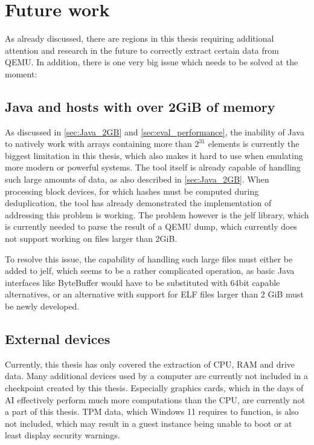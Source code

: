 \section{Future work}
As already discussed, there are regions in this thesis requiring additional attention and research in the future to correctly extract certain data from QEMU.
In addition, there is one very big issue which needs to be solved at the moment:

\subsection{Java and hosts with over 2GiB of memory}
As discussed in \autoref{sec:Java_2GB} and \autoref{sec:eval_performance},
the inability of Java to natively work with arrays containing more than $2^{31}$ elements
is currently the biggest limitation in this thesis,
which also makes it hard to use when emulating more modern or powerful systems.
The tool itself is already capable of handling such large amounts of data, as also described in \autoref{sec:Java_2GB}.
When processing block devices, for which hashes must be computed during deduplication,
the tool has already demonstrated the implementation of addressing this problem is working.
The problem however is the jelf library, which is currently needed to parse the result of a QEMU dump,
which currently does not support working on files larger than 2GiB.

To resolve this issue, the capability of handling such large files must either be added to jelf,
which seems to be a rather complicated operation,
as basic Java interfaces like ByteBuffer would have to be substituted with 64bit capable alternatives,
or an alternative with support for ELF files larger than 2 GiB must be newly developed.

\subsection{External devices}
Currently, this thesis has only covered the extraction of CPU, RAM and drive data.
Many additional devices used by a computer are currently not included in a checkpoint created by this thesis.
Especially graphics cards, which in the days of AI effectively perform much more computations than the CPU,
are currently not a part of this thesis.
TPM data, which Windows 11 requires to function, is also not included,
which may result in a guest instance being unable to boot or at least display security warnings.

